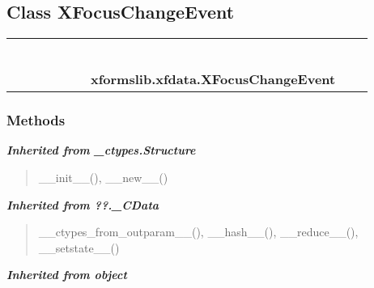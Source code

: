 \subsection{Class XFocusChangeEvent}

    \label{xformslib:xfdata:XFocusChangeEvent}
\begin{tabular}{cccccccccc}
\multicolumn{2}{r}{\settowidth{\BCL}{object}\multirow{2}{\BCL}{object}}
&&
&&
&&
  \\\cline{3-3}
  &&\multicolumn{1}{c|}{}
&&
&&
&&
  \\
\multicolumn{4}{r}{\settowidth{\BCL}{??.\_CData}\multirow{2}{\BCL}{??.\_CData}}
&&
&&
  \\\cline{5-5}
  &&&&\multicolumn{1}{c|}{}
&&
&&
  \\
\multicolumn{6}{r}{\settowidth{\BCL}{\_ctypes.Structure}\multirow{2}{\BCL}{\_ctypes.Structure}}
&&
  \\\cline{7-7}
  &&&&&&\multicolumn{1}{c|}{}
&&
  \\
&&&&&&\multicolumn{2}{l}{\textbf{xformslib.xfdata.XFocusChangeEvent}}
\end{tabular}



  \subsubsection{Methods}


\large{\textbf{\textit{Inherited from \_ctypes.Structure}}}

\begin{quote}
\_\_init\_\_(), \_\_new\_\_()
\end{quote}

\large{\textbf{\textit{Inherited from ??.\_CData}}}

\begin{quote}
\_\_ctypes\_from\_outparam\_\_(), \_\_hash\_\_(), \_\_reduce\_\_(), \_\_setstate\_\_()
\end{quote}

\large{\textbf{\textit{Inherited from object}}}

